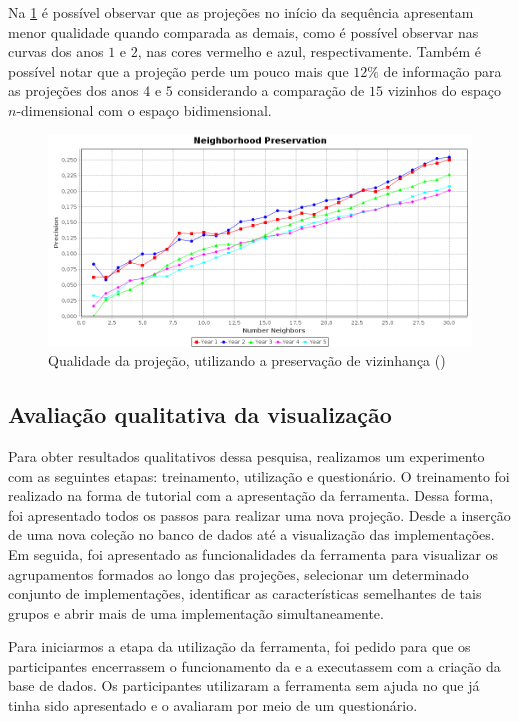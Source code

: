 	Na \cref{fig:neighborhoodAPOO30} é possível observar que as projeções no início da
	sequência apresentam menor qualidade quando comparada as demais, como é possível observar
	nas curvas dos anos $1$ e $2$, nas cores vermelho e azul, respectivamente. Também é
	possível notar que a projeção perde um pouco mais que $12\%$ de informação para as
	projeções dos anos $4$ e $5$ considerando a comparação de $15$ vizinhos do espaço
	$n$-dimensional com o espaço bidimensional.
	
	
	\begin{figure}
		\centering
		\includegraphics[width=0.7\linewidth]{imagem/neighborhoodAPOO30}
		\caption{Qualidade da projeção, utilizando a preservação de vizinhança ()}
		\label{fig:neighborhoodAPOO30}
	\end{figure}
	
	
	\subsection{Avaliação qualitativa da visualização}
		Para obter resultados qualitativos dessa pesquisa, realizamos um experimento com
		as seguintes etapas: treinamento, utilização e questionário. O treinamento foi
		realizado na forma de tutorial com a apresentação da ferramenta. Dessa forma,
		foi apresentado todos os passos para realizar uma nova projeção. Desde a inserção
		de uma nova coleção no banco de dados até a visualização das implementações. Em
		seguida, foi apresentado as funcionalidades da ferramenta para visualizar os
		agrupamentos formados ao longo das projeções, selecionar um determinado conjunto
		de implementações, identificar as características semelhantes de tais grupos e
		abrir mais de uma implementação simultaneamente.
		
		Para iniciarmos a etapa da utilização da ferramenta, foi pedido para que os
		participantes encerrassem o funcionamento da  e a
		executassem com a criação da base de dados. Os participantes utilizaram a
		ferramenta sem ajuda no que já tinha sido apresentado e o avaliaram por meio
		de um questionário.
		
